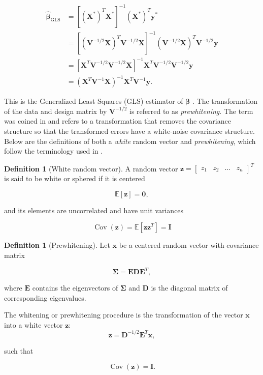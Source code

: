 \documentclass[english]{pwr_wmat_praca_dyplomowa}
\theoremstyle{definition}
\newtheorem{definition}[theorem]{Definition}
\theoremstyle{remark}
\begin{document}
\begin{equation}
    \begin{aligned}
        \widehat{\boldsymbol{\beta}}_{\mathrm{GLS}} 
        &= \left[ \left( \mathbf{X}^{\ast} \right)^T \mathbf{X}^{\ast} \right]^{-1} \left( \mathbf{X}^{\ast} \right)^T \mathbf{y}^{\ast} \\
        &= \left[ \left( \mathbf{V}^{-1/2} \mathbf{X} \right)^T \mathbf{V}^{-1/2} \mathbf{X} \right]^{-1} \left( \mathbf{V}^{-1/2} \mathbf{X} \right)^T \mathbf{V}^{-1/2} \mathbf{y} \\
        &= \left[  \mathbf{X}^T \mathbf{V}^{-1/2} \mathbf{V}^{-1/2} \mathbf{X} \right]^{-1} \mathbf{X}^T \mathbf{V}^{-1/2} \mathbf{V}^{-1/2} \mathbf{y} \\
        &= \left( \mathbf{X}^T \mathbf{V}^{-1} \mathbf{X} \right)^{-1} \mathbf{X}^T \mathbf{V}^{-1} \mathbf{y}.
    \end{aligned}
    \label{eq:gls-estimator}
\end{equation}

This is the Generalized Least Squares (GLS) estimator of $\boldsymbol{\beta}$ \cite[Equation 2.12]{agresti}. The transformation of the data and design matrix by $\mathbf{V}^{-1/2}$ is referred to as \textit{prewhitening}. The term was coined in \cite[p. 215]{prewhitening} and refers to a transformation that removes the covariance structure so that the transformed errors have a white-noise covariance structure. Below are the definitions of both a \textit{white} random vector and \textit{prewhitening}, which follow the terminology used in \cite{ica}. 

\newpage
\begin{definition}[White random vector]
A random vector $\mathbf{z} = \begin{bmatrix}z_1 & z_2 & \ldots & z_n\end{bmatrix}^T$ is said to be white or sphered if it is centered

$$ \mathbb{E}[\mathbf{z}] = \mathbf{0}, $$

and its elements are uncorrelated and have unit variances

$$ \operatorname{Cov}(\mathbf{z}) = \mathbb{E}\left[\mathbf{z}\mathbf{z}^T\right] = \mathbf{I} $$
\end{definition}

\begin{definition}[Prewhitening]
\label{def:prewhitening}
Let $\mathbf{x}$ be a centered random vector with covariance matrix

$$ \boldsymbol{\Sigma} = \mathbf{E}\mathbf{D}\mathbf{E}^T, $$

where $\mathbf{E}$ contains the eigenvectors of $\boldsymbol{\Sigma}$
and $\mathbf{D}$ is the diagonal matrix of corresponding eigenvalues.

The whitening or prewhitening procedure is the transformation of the vector $\mathbf{x}$ into a white vector $\mathbf{z}$:
$$ \mathbf{z} = \mathbf{D}^{-1/2}\mathbf{E}^T\mathbf{x}, $$

such that

$$ \operatorname{Cov}(\mathbf{z}) = \mathbf{I}. $$
\end{definition}
\end{document}
